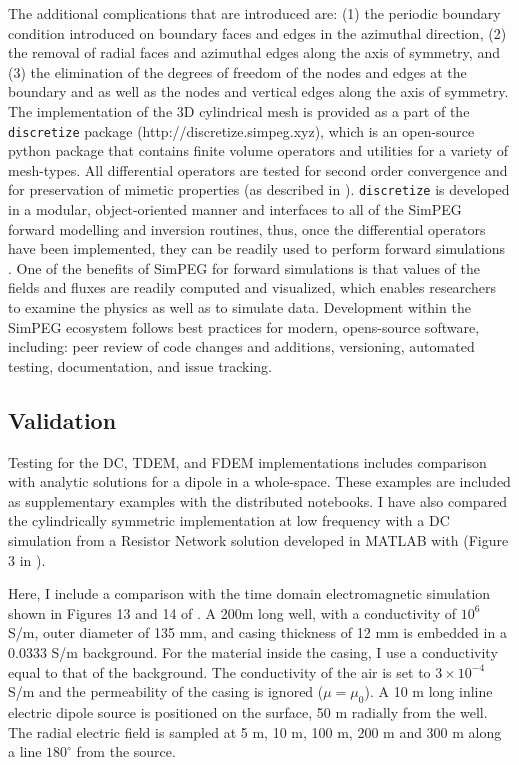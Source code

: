 The additional complications that are introduced are: (1) the periodic boundary condition introduced on boundary faces and edges in the azimuthal direction, (2) the removal of radial faces and azimuthal edges along the axis of symmetry, and (3) the elimination of the degrees of freedom of the nodes and edges at the boundary and as well as the nodes and vertical edges along the axis of symmetry. The implementation of the 3D cylindrical mesh is provided as a part of the \texttt{discretize} package (http://discretize.simpeg.xyz), which is an open-source python package that contains finite volume operators and utilities for a variety of mesh-types. All differential operators are tested for second order convergence and for preservation of mimetic properties (as described in \cite{Haber2014}). \texttt{discretize} is developed in a modular, object-oriented manner and interfaces to all of the SimPEG forward modelling and inversion routines, thus, once the differential operators have been implemented, they can be readily used to perform forward simulations \citep{Cockett2015}.  One of the benefits of SimPEG for forward simulations is that values of the fields and fluxes are readily computed and visualized, which enables researchers to examine the physics as well as to simulate data. Development within the SimPEG ecosystem follows best practices for modern, opens-source software, including: peer review of code changes and additions, versioning, automated testing, documentation, and issue tracking.

\subsection{Validation}
Testing for the DC, TDEM, and FDEM implementations includes comparison with analytic solutions for a dipole in a whole-space. These examples are included as supplementary examples with the distributed notebooks. I have also compared the cylindrically symmetric implementation at low frequency with a DC simulation from a Resistor Network solution developed in MATLAB with (Figure 3 in \cite{Yang2016}).

Here, I include a comparison with the time domain electromagnetic simulation shown in Figures 13 and 14 of \cite{Commer2015}. A 200m long well, with a conductivity of $10^{6}$ S/m, outer diameter of 135 mm, and casing thickness of 12 mm is embedded in a 0.0333 S/m background. For the material inside the casing, I use a conductivity equal to that of the background. The conductivity of the air is set to $3 \times 10^{-4}$ S/m and the permeability of the casing is ignored ($\mu = \mu_0$). A 10 m long inline electric dipole source is positioned on the surface, 50 m radially from the well. The radial electric field is sampled at 5 m, 10 m, 100 m, 200 m and 300 m along a line $180^{\circ}$ from the source.

